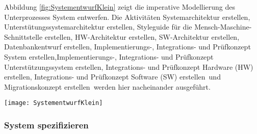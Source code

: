 Abbildung \ref{fig:SystementwurfKlein} zeigt die imperative Modellierung des Unterprozesses \grqq System entwerfen\grqq.\newline
Die Aktivitäten \grqq Systemarchitektur erstellen\grqq, \grqq Unterstütungssystemarchitektur erstellen\grqq, \grqq Styleguide für die Mensch-Maschine-Schnittstelle erstellen\grqq, \grqq HW-Architektur erstellen\grqq, \grqq SW-Architektur erstellen\grqq, \grqq Datenbankentwurf erstellen\grqq, \grqq Implementierungs-, Integrations- und Prüfkonzept System erstellen\grqq,\grqq Implementierungs-, Integrations- und Prüfkonzept Unterstützungssystem erstellen\grqq, \grqq Integrations- und Prüfkonzept Hardware (HW) erstellen\grqq, \grqq Integrations- und Prüfkonzept Software (SW) erstellen\grqq \ und \grqq Migrationskonzept erstellen\grqq \ werden hier nacheinander ausgeführt.
\begin{sidewaysfigure}[!htbp]
\begin{center}
  \texttt{[image: SystementwurfKlein]} %
  \caption{System entwerfen V-Modell XT - imperativ}
  \label{fig:SystementwurfKlein}
\end{center}
\end{sidewaysfigure}


\subsubsection{System spezifizieren}

